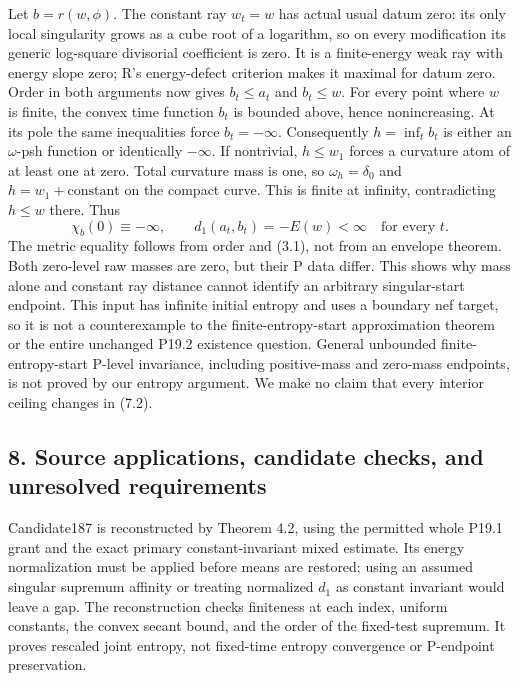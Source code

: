 \documentclass[
  11pt,
]{article}
\begin{document}
Let \(b=r(w,\phi)\). The constant ray \(w_t=w\) has actual usual datum
zero: its only local singularity grows as a cube root of a logarithm, so
on every modification its generic log-square divisorial coefficient is
zero. It is a finite-energy weak ray with energy slope zero; R's
energy-defect criterion makes it maximal for datum zero. Order in both
arguments now gives \(b_t\leq a_t\) and \(b_t\leq w\). For every point
where \(w\) is finite, the convex time function \(b_t\) is bounded
above, hence nonincreasing. At its pole the same inequalities force
\(b_t=-\infty\). Consequently \(h=\inf_t b_t\) is either an
\(\omega\)-psh function or identically \(-\infty\). If nontrivial,
\(h\leq w_1\) forces a curvature atom of at least one at zero. Total
curvature mass is one, so \(\omega_h=\delta_0\) and
\(h=w_1+\text{constant}\) on the compact curve. This is finite at
infinity, contradicting \(h\leq w\) there. Thus
\[ \chi_b(0)\equiv-\infty,\qquad
    d_1(a_t,b_t)=-E(w)<\infty\quad\text{for every }t. \tag{7.2}\] The
metric equality follows from order and (3.1), not from an envelope
theorem. Both zero-level raw masses are zero, but their P data differ.
This shows why mass alone and constant ray distance cannot identify an
arbitrary singular-start endpoint. This input has infinite initial
entropy and uses a boundary nef target, so it is not a counterexample to
the finite-entropy-start approximation theorem or the entire unchanged
P19.2 existence question. General unbounded finite-entropy-start P-level
invariance, including positive-mass and zero-mass endpoints, is not
proved by our entropy argument. We make no claim that every interior
ceiling changes in (7.2).

\subsection{8. Source applications, candidate checks, and unresolved
requirements}\label{source-applications-candidate-checks-and-unresolved-requirements}

Candidate187 is reconstructed by Theorem 4.2, using the permitted whole
P19.1 grant and the exact primary constant-invariant mixed estimate. Its
energy normalization must be applied before means are restored; using an
assumed singular supremum affinity or treating normalized \(d_1\) as
constant invariant would leave a gap. The reconstruction checks
finiteness at each index, uniform constants, the convex secant bound,
and the order of the fixed-test supremum. It proves rescaled joint
entropy, not fixed-time entropy convergence or P-endpoint preservation.
\end{document}
